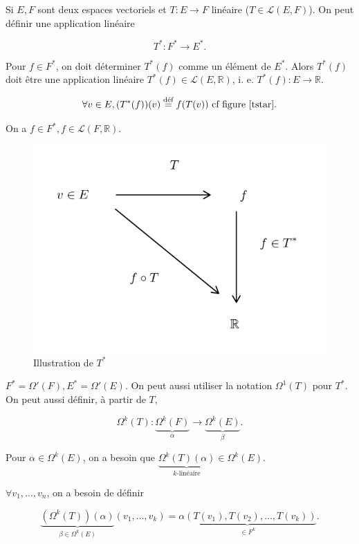 \documentclass[french]{article}
\begin{document}
Si \(E, F\) sont deux espaces vectoriels et \(T : E \longrightarrow F\) linéaire (\(T \in \mathscr{L}(E, F) \)). On peut définir une application linéaire

\[T ^{*} : F ^{*} \longrightarrow E ^{*}.\]

Pour \(f \in F ^{*}\), on doit déterminer \(T ^{*}(f)\) comme un élément de \(E ^{*}\). Alors \(T ^{*}(f)\) doit être une application linéaire \(T ^{*}(f) \in \mathscr{L}(E, \mathbb{R})\), i. e. \(T ^{*}(f) : E \longrightarrow \mathbb{R}\).

\[\forall v \in E, (T ^{*}(f))(v) \stackrel{\text{déf}}{=} f(T(v)) \text{ cf figure \ref{tstar}}. \]

On a \(f \in F ^{*}, f \in \mathscr{L}(F, \mathbb{R})\).

\begin{figure}[h!]
  \centering
  \includegraphics[scale=0.3]{figures/tstar.png}
  \caption{Illustration de \(T ^{*}\)}
  \label{tstar}
\end{figure}

\(F ^{*} = \Omega'(F), E ^{*} = \Omega'(E)\). On peut aussi utiliser la notation \(\Omega ^{1}(T)\) pour \(T ^{*}\). On peut aussi définir, à partir de \(T\),

\[\Omega ^{k}(T) : \underbrace{\Omega ^{k}(F)}_{\alpha}  \longrightarrow \underbrace{\Omega ^{k}(E)}_{\beta}.\]

Pour \(\alpha \in \Omega ^{k}(E)\), on a besoin que \( \underbrace{\Omega ^{k}(T)(\alpha)}_{k\text{-linéaire}} \in \Omega ^{k}(E)\).

\(\forall v_1, \dots, v_n\), on a besoin de définir

\[ \underbrace{(\Omega ^{k}(T))(\alpha)}_{\beta \in \Omega ^{k}(E)}(v_1, \dots, v_k) = \underbrace{\alpha(T(v_1), T(v_2), \dots, T(v_k))}_{\in F ^{k}}.\]
\end{document}
